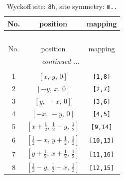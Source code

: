\documentclass[fleqn,8pt]{jsarticle}
\begin{document}
\begin{longtable}{ccc}
\caption{Wyckoff site: {\tt 8h}, site symmetry: {\tt m..}}
 \\
 \hline \hline
No. & position & mapping \\ \hline \endfirsthead

\multicolumn{2}{l}{\tablename\ \thetable{}} \\
 \hline \hline
No. & position & mapping \\ \hline \endhead

 \hline \hline
\multicolumn{2}{r}{\footnotesize\it continued ...} \\ \endfoot

 \hline \hline
\multicolumn{2}{r}{} \\ \endlastfoot

1 & $\left[ x,\, y,\, 0 \right]$ & {\tt [1,8]} \\ \hline
2 & $\left[ - y,\, x,\, 0 \right]$ & {\tt [2,7]} \\ \hline
3 & $\left[ y,\, - x,\, 0 \right]$ & {\tt [3,6]} \\ \hline
4 & $\left[ - x,\, - y,\, 0 \right]$ & {\tt [4,5]} \\ \hline
5 & $\left[ x + \frac{1}{2},\, \frac{1}{2} - y,\, \frac{1}{2} \right]$ & {\tt [9,14]} \\ \hline
6 & $\left[ \frac{1}{2} - x,\, y + \frac{1}{2},\, \frac{1}{2} \right]$ & {\tt [10,13]} \\ \hline
7 & $\left[ y + \frac{1}{2},\, x + \frac{1}{2},\, \frac{1}{2} \right]$ & {\tt [11,16]} \\ \hline
8 & $\left[ \frac{1}{2} - y,\, \frac{1}{2} - x,\, \frac{1}{2} \right]$ & {\tt [12,15]} \\
\end{longtable}
\renewcommand{\arraystretch}{1.2}
\end{document}
